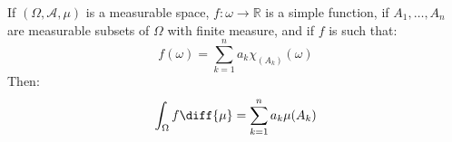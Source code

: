             \begin{theorem}
                If $(\Omega,\mathcal{A},\mu)$ is a measurable
                space, $f:\omega\rightarrow\mathbb{R}$ is
                a simple function, if $A_{1},\dots,A_{n}$
                are measurable subsets of $\Omega$ with
                finite measure, and if $f$ is such that:
                \begin{equation}
                    f(\omega)=\sum_{k=1}^{n}a_{k}
                        \chi_(A_{k})(\omega)
                \end{equation}
                Then:
                \begin{equation}
                    \int_{\Omega}f\diff{\mu}=
                    \sum_{k=1}^{n}a_{k}\mu(A_{k})
                \end{equation}
            \end{theorem}
